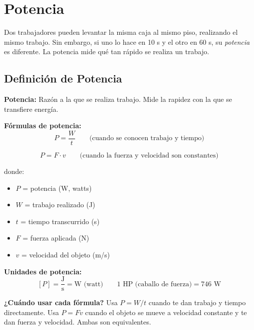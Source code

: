 \newpage

\section{Potencia}

\begin{seccion}
Dos trabajadores pueden levantar la misma caja al mismo piso, realizando el mismo trabajo. Sin embargo, si uno lo hace en 10 s y el otro en 60 s, su \textit{potencia} es diferente. La potencia mide qué tan rápido se realiza un trabajo.
\end{seccion}

\subsection{Definición de Potencia}

\begin{seccion}
\begin{definicion}
    \textbf{Potencia:} Razón a la que se realiza trabajo. Mide la rapidez con la que se transfiere energía.
\end{definicion}

\begin{ecuacion}
\textbf{Fórmulas de potencia:}
$$P = \frac{W}{t} \qquad \text{(cuando se conocen trabajo y tiempo)}$$

$$P = F \cdot v \qquad \text{(cuando la fuerza y velocidad son constantes)}$$

donde:
\begin{itemize}
    \item $P$ = potencia (W, watts)
    \item $W$ = trabajo realizado (J)
    \item $t$ = tiempo transcurrido (s)
    \item $F$ = fuerza aplicada (N)
    \item $v$ = velocidad del objeto (m/s)
\end{itemize}
\end{ecuacion}

\textbf{Unidades de potencia:}
$$[P] = \frac{\text{J}}{\text{s}} = \text{W (watt)} \qquad 1 \text{ HP (caballo de fuerza)} = 746 \text{ W}$$

\begin{nota}
    \textbf{¿Cuándo usar cada fórmula?} Usa $P = W/t$ cuando te dan trabajo y tiempo directamente. Usa $P = Fv$ cuando el objeto se mueve a velocidad constante y te dan fuerza y velocidad. Ambas son equivalentes.
\end{nota}
\end{seccion}

